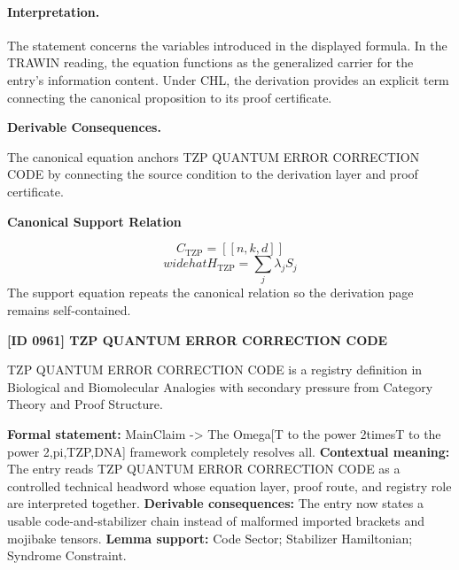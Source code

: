 \paragraph{Interpretation.}
The statement concerns the variables introduced in the displayed formula. In the TRAWIN reading, the equation functions as the generalized carrier for the entry’s information content. Under CHL, the derivation provides an explicit term connecting the canonical proposition to its proof certificate.

\par\vspace{0.35em}
\noindent\textbf{Derivable Consequences.}\quad
\begingroup
\footnotesize
\raggedright
The canonical equation anchors TZP QUANTUM ERROR CORRECTION CODE by connecting the source condition to the derivation layer and proof certificate.
\par\endgroup

\noindent\textbf{Canonical Support Relation}\par
\[
C_{\mathrm{TZP}}=[[n,k,d]]
\]
\[
widehat{H}_{\mathrm{TZP}}=\sum_j \lambda_j S_j
\]
\noindent The support equation repeats the canonical relation so the derivation page remains self-contained.\par

\clearpage
\noindent\textbf{[ID 0961] TZP QUANTUM ERROR CORRECTION CODE}\par
\vspace{0.35em}
\begingroup\small
{}
TZP QUANTUM ERROR CORRECTION CODE is a registry definition in Biological and Biomolecular Analogies with secondary pressure from Category Theory and Proof Structure.

\begingroup\footnotesize\setlength{\emergencystretch}{3em}\sloppy
\textbf{Formal statement:} MainClaim -> The Omega[T to the power 2timesT to the power 2,pi,TZP,DNA] framework completely resolves all. \textbf{Contextual meaning:} The entry reads TZP QUANTUM ERROR CORRECTION CODE as a controlled technical headword whose equation layer, proof route, and registry role are interpreted together. \textbf{Derivable consequences:} The entry now states a usable code-and-stabilizer chain instead of malformed imported brackets and mojibake tensors. \textbf{Lemma support:} Code Sector; Stabilizer Hamiltonian; Syndrome Constraint.\par
\endgroup


